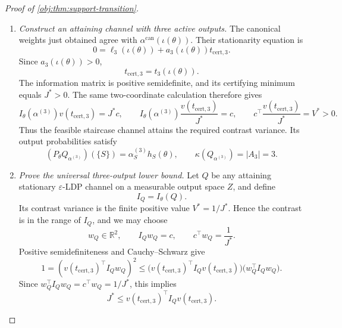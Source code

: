 \documentclass[11pt]{article}
\begin{document}
\begin{proof}[Proof of \cref{obj:thm:support-transition}]
\begin{enumerate}
For any feasible weights supported on \(A_3\), the normalization rows are
\[
\begin{aligned}
3\beta_{S_1}+\beta_{S_6}+\beta_{S_8}&=1,\\
\beta_{S_1}+3\beta_{S_6}+\beta_{S_8}&=1,\\
\beta_{S_1}+\beta_{S_6}+3\beta_{S_8}&=1,
\end{aligned}
\]
with the second row also applying to the other record in \(S_6\). Subtraction and substitution give
\[
\beta_{S_1}=\beta_{S_6}=\beta_{S_8}=\frac15.
\]
These equations apply both to \(\alpha^{(3)}\) and to every feasible optimal \(\beta\). Consequently,
\[
\alpha^{(3)}_S=
\begin{cases}
1/5,&S\in A_3,\\
0,&S\notin A_3,
\end{cases}
\qquad
\beta=\alpha^{(3)}.
\]

\item \emph{Construct an attaining channel with three active outputs.}
The canonical weights just obtained agree with
\(\alpha^{\mathrm{can}}(\iota(\theta))\). Their stationarity equation is
\[
0=\ell_3(\iota(\theta))+a_3(\iota(\theta))t_{\mathrm{cert},3}.
\]
Since \(a_3(\iota(\theta))>0\),
\[
t_{\mathrm{cert},3}=t_3(\iota(\theta)).
\]
The information matrix is positive semidefinite, and its certifying minimum equals \(J^*>0\). The same two-coordinate calculation therefore gives
\[
I_\theta(\alpha^{(3)})v(t_{\mathrm{cert},3})=J^*c,
\qquad
I_\theta(\alpha^{(3)})
 \frac{v(t_{\mathrm{cert},3})}{J^*}=c,
\qquad
c^\top\frac{v(t_{\mathrm{cert},3})}{J^*}=V^*>0.
\]
Thus the feasible staircase channel attains the required contrast variance. Its output probabilities satisfy
\[
(P_\theta Q_{\alpha^{(3)}})(\{S\})
=\alpha^{(3)}_S h_S(\theta),
\qquad
\kappa(Q_{\alpha^{(3)}})=|A_3|=3.
\]

\item \emph{Prove the universal three-output lower bound.}
Let \(Q\) be any attaining stationary \(\varepsilon\)-LDP channel on a measurable output space \(Z\), and define
\[
I_Q=I_\theta(Q).
\]
Its contrast variance is the finite positive value \(V^*=1/J^*\). Hence the contrast is in the range of \(I_Q\), and we may choose
\[
w_Q\in\mathbb R^2,\qquad
I_Qw_Q=c,\qquad
c^\top w_Q=\frac1{J^*}.
\]
Positive semidefiniteness and Cauchy--Schwarz give
\[
1=(v(t_{\mathrm{cert},3})^\top I_Qw_Q)^2
\le
\bigl(v(t_{\mathrm{cert},3})^\top I_Qv(t_{\mathrm{cert},3})\bigr)
 \bigl(w_Q^\top I_Qw_Q\bigr).
\]
Since \(w_Q^\top I_Qw_Q=c^\top w_Q=1/J^*\), this implies
\[
J^*\le
v(t_{\mathrm{cert},3})^\top I_Qv(t_{\mathrm{cert},3}).
\]


\end{enumerate}
\end{proof}
\end{document}
